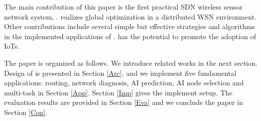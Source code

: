 The main contribution of this paper is the first 
practical SDN wireless sensor network system, {\sdn}. 
{\sdn} realizes global optimization in a distributed WSN environment.
Other contributions include several simple but effective strategies and algorithms 
in the implemented applications of {\sdn}. 
{\sdn} has the potential to promote the adoption of IoTs.



The paper is organized as follows. We introduce related works in the next section. 
Design of {\sdn} is presented in Section \ref{Arc}, 
and we implement five fundamental applications: routing, network diagnosis, 
AI prediction, AI node selection and multi-task in Section \ref{App}. 
Section \ref{Imp} gives the implement setup.
The evaluation results are provided in Section \ref{Eva} 
and we conclude the paper in Section \ref{Con}.

